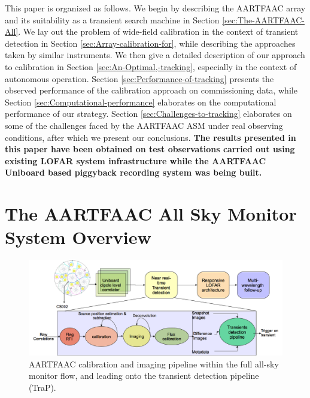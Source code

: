 \documentclass{aa}
\begin{document}
This paper is  organized as follows.  We begin by  describing the AARTFAAC array
and   its    suitability   as   a   transient   search    machine   in   Section
\ref{sec:The-AARTFAAC-All}. We lay out  the problem of wide-field calibration in
the context  of transient detection  in Section \ref{sec:Array-calibration-for},
while describing  the approaches taken by  similar instruments.  We  then give a
detailed   description    of   our   approach   to    calibration   in   Section
\ref{sec:An-Optimal,-tracking},   especially  in   the  context   of  autonomous
operation.   Section  \ref{sec:Performance-of-tracking}  presents  the  observed
performance  of the calibration  approach on  commissioning data,  while Section
\ref{sec:Computational-performance} elaborates  on the computational performance
of our strategy.  Section \ref{sec:Challenges-to-tracking} elaborates on some of
the challenges faced by the  AARTFAAC ASM under real observing conditions, after
which we present  our conclusions. \textbf {The results  presented in this paper
  have  been obtained  on test  observations  carried out  using existing  LOFAR
  system infrastructure  while the  AARTFAAC Uniboard based  piggyback recording
  system was being built.}


\section{\label{sec:The-AARTFAAC-All}The AARTFAAC All Sky Monitor System
Overview} 

\begin{figure}[htbp]
\centering
\includegraphics[width=1\textwidth]{Figs/AFAAC_blkdia_latest.png}
\caption{AARTFAAC  calibration  and imaging  pipeline  within  the full  all-sky
  monitor flow, and leading onto the transient detection pipeline (TraP).}
\label{fig:The-AARTFAAC-calibration}
\end{figure}
\end{document}
